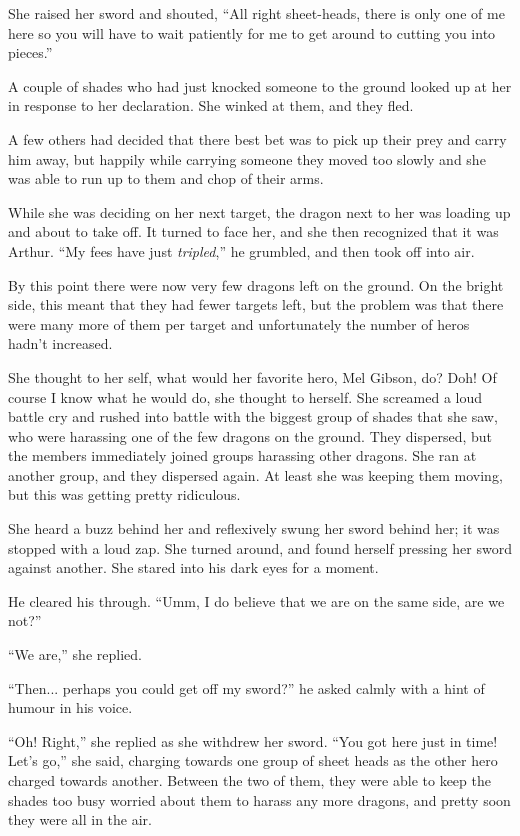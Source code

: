 \documentclass[showtrims,b6paper,draft,10pt]{memoir}
\begin{document}
She raised her sword and shouted, ``All right sheet-heads, there is only one of me here so you will have to wait patiently for me to get around to cutting you into pieces.''

A couple of shades who had just knocked someone to the ground looked up at her in response to her declaration.  She winked at them, and they fled.

A few others had decided that there best bet was to pick up their prey and carry him away, but happily while carrying someone they moved too slowly and she was able to run up to them and chop of their arms.

While she was deciding on her next target, the dragon next to her was loading up and about to take off.  It turned to face her, and she then recognized that it was Arthur.  ``My fees have just \emph{tripled},'' he grumbled, and then took off into air.

By this point there were now very few dragons left on the ground.  On the bright side, this meant that they had fewer targets left, but the problem was that there were many more of them per target and unfortunately the number of heros hadn't increased.

She thought to her self, what would her favorite hero, Mel Gibson, do?  Doh!  Of course I know what he would do, she thought to herself.  She screamed a loud battle cry and rushed into battle with the biggest group of shades that she saw, who were harassing one of the few dragons on the ground.  They dispersed, but the members immediately joined groups harassing other dragons.  She ran at another group, and they dispersed again.  At least she was keeping them moving, but this was getting pretty ridiculous.

She heard a buzz behind her and reflexively swung her sword behind her;  it was stopped with a loud zap.  She turned around, and found herself pressing her sword against another.  She stared into his dark eyes for a moment.

He cleared his through.  ``Umm, I do believe that we are on the same side, are we not?''

``We are,'' she replied.

``Then... perhaps you could get off my sword?''  he asked calmly with a hint of humour in his voice.

``Oh!  Right,'' she replied as she withdrew her sword.  ``You got here just in time!  Let's go,'' she said, charging towards one group of sheet heads as the other hero charged towards another.  Between the two of them, they were able to keep the shades too busy worried about them to harass any more dragons, and pretty soon they were all in the air.
\end{document}
